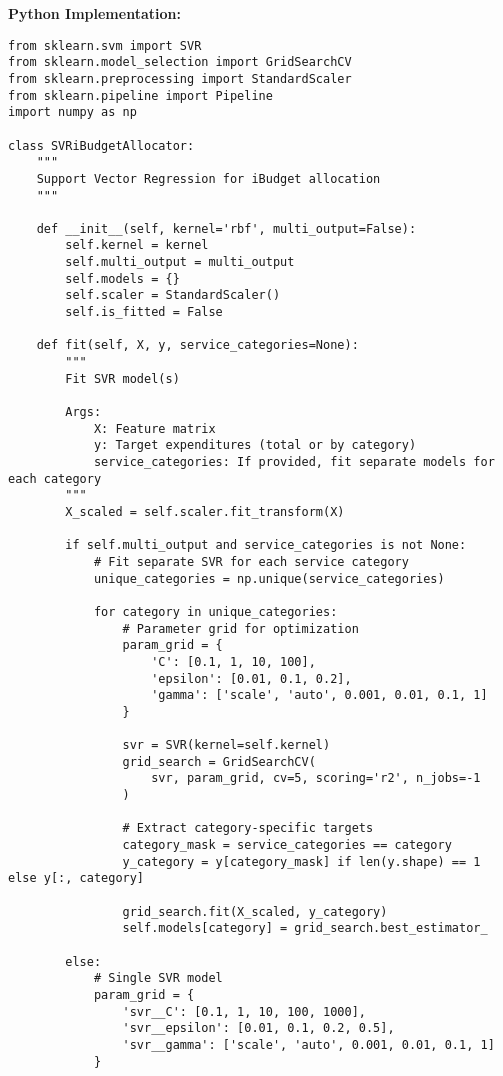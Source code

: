 \textbf{Python Implementation:}
\begin{lstlisting}
from sklearn.svm import SVR
from sklearn.model_selection import GridSearchCV
from sklearn.preprocessing import StandardScaler
from sklearn.pipeline import Pipeline
import numpy as np

class SVRiBudgetAllocator:
    """
    Support Vector Regression for iBudget allocation
    """
    
    def __init__(self, kernel='rbf', multi_output=False):
        self.kernel = kernel
        self.multi_output = multi_output
        self.models = {}
        self.scaler = StandardScaler()
        self.is_fitted = False
        
    def fit(self, X, y, service_categories=None):
        """
        Fit SVR model(s)
        
        Args:
            X: Feature matrix
            y: Target expenditures (total or by category)
            service_categories: If provided, fit separate models for each category
        """
        X_scaled = self.scaler.fit_transform(X)
        
        if self.multi_output and service_categories is not None:
            # Fit separate SVR for each service category
            unique_categories = np.unique(service_categories)
            
            for category in unique_categories:
                # Parameter grid for optimization
                param_grid = {
                    'C': [0.1, 1, 10, 100],
                    'epsilon': [0.01, 0.1, 0.2],
                    'gamma': ['scale', 'auto', 0.001, 0.01, 0.1, 1]
                }
                
                svr = SVR(kernel=self.kernel)
                grid_search = GridSearchCV(
                    svr, param_grid, cv=5, scoring='r2', n_jobs=-1
                )
                
                # Extract category-specific targets
                category_mask = service_categories == category
                y_category = y[category_mask] if len(y.shape) == 1 else y[:, category]
                
                grid_search.fit(X_scaled, y_category)
                self.models[category] = grid_search.best_estimator_
        
        else:
            # Single SVR model
            param_grid = {
                'svr__C': [0.1, 1, 10, 100, 1000],
                'svr__epsilon': [0.01, 0.1, 0.2, 0.5],
                'svr__gamma': ['scale', 'auto', 0.001, 0.01, 0.1, 1]
            }
            

\end{lstlisting}
